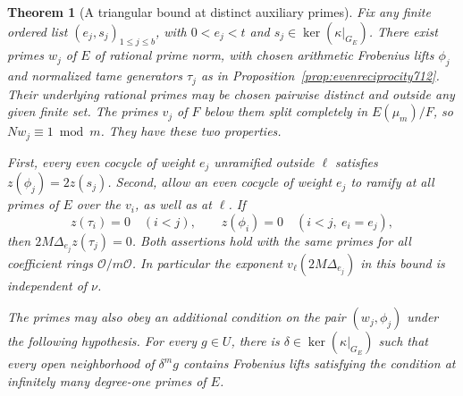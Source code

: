 \documentclass[a4paper,11pt]{article}
\newtheorem{theorem}[proposition]{Theorem}
\theoremstyle{definition}
\theoremstyle{remark}
\numberwithin{equation}{section}
\begin{document}
\begin{theorem}[A triangular bound at distinct auxiliary primes]
\leavevmode\label{thm:auxtriangle713}
Fix any finite ordered list \((e_j,s_j)_{1\le j\le b}\), with
\(0<e_j<t\) and \(s_j\in\ker(\kappa|_{G_E})\). There exist
primes \(w_j\) of \(E\) of rational prime norm, with chosen
arithmetic Frobenius lifts \(\phi_j\) and normalized tame
generators \(\tau_j\) as in Proposition~\ref{prop:evenreciprocity712}.
Their underlying rational primes may be chosen pairwise
distinct and outside any given finite set. The primes \(v_j\)
of \(F\) below them split completely in \(E(\mu_m)/F\),
so \(Nw_j\equiv1\bmod m\). They have these two properties.

First, every even cocycle of weight \(e_j\) unramified
outside \(\ell\) satisfies \(z(\phi_j)=2z(s_j)\).
Second, allow an even cocycle of weight \(e_j\) to ramify
at all primes of \(E\) over the \(v_i\), as well as at
\(\ell\). If
\[
   z(\tau_i)=0\quad(i<j),\qquad
   z(\phi_i)=0\quad(i<j,\ e_i=e_j),
\]
then \(2M\Delta_{e_j}z(\tau_j)=0\).
Both assertions hold with the same primes for all coefficient
rings \(\mathcal O/m\mathcal O\). In particular the exponent
\(v_\ell(2M\Delta_{e_j})\) in this bound is independent of
\(\nu\).

The primes may also obey an additional condition on the pair
\((w_j,\phi_j)\) under the following hypothesis. For every
\(g\in U\), there is \(\delta\in\ker(\kappa|_{G_E})\) such
that every open neighborhood of \(\delta^m g\) contains
Frobenius lifts satisfying the condition at infinitely many
degree-one primes of \(E\).
\end{theorem}
\end{document}

